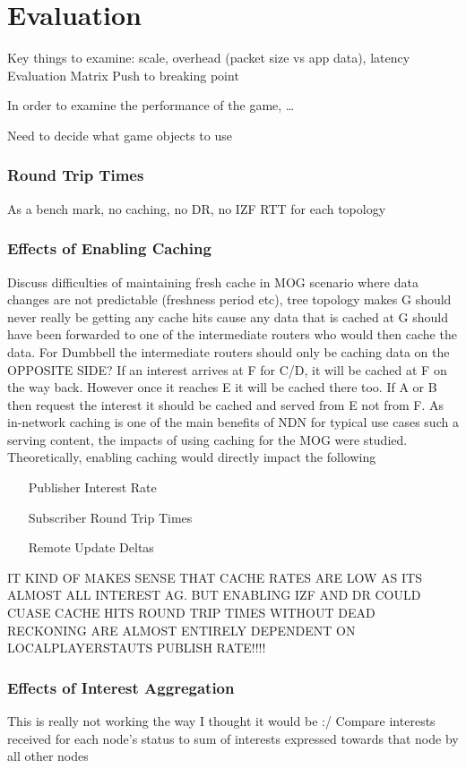 \chapter{Evaluation}
Key things to examine: scale, overhead (packet size vs app data), latency
Evaluation Matrix
Push to breaking point

In order to examine the performance of the game, \dots

Need to decide what game objects to use

\subsection{Round Trip Times}
As a bench mark, no caching, no DR, no IZF RTT for each topology

\subsection{Effects of Enabling Caching}
Discuss difficulties of maintaining fresh cache in MOG scenario where data changes are not predictable (freshness period etc), tree topology makes G should never really be getting any cache hits cause any data that is cached at G should have been forwarded to one of the intermediate routers who would then cache the data. For Dumbbell the intermediate routers should only be caching data on the OPPOSITE SIDE? If an interest arrives at F for C/D, it will be cached at F on the way back. However once it reaches E it will be cached there too. If A or B  then request the interest it should be cached and served from E not from F. 
As in-network caching is one of the main benefits of NDN for typical use cases such a serving content, the impacts of using caching for the MOG were studied. Theoretically, enabling caching would directly impact the following


\begin{itemize}
    \item[Publisher Interest Rate]
    \item[Subscriber Round Trip Times]
    \item[Remote Update Deltas]  
\end{itemize}

IT KIND OF MAKES SENSE THAT CACHE RATES ARE LOW AS ITS ALMOST ALL INTEREST AG. BUT ENABLING IZF AND DR COULD CUASE CACHE HITS 
ROUND TRIP TIMES WITHOUT DEAD RECKONING ARE ALMOST ENTIRELY DEPENDENT ON LOCALPLAYERSTAUTS PUBLISH RATE!!!!
\subsection{Effects of Interest Aggregation}
This is really not working the way I thought it would be :/
Compare interests received for each node's status to sum of interests expressed towards that node by all other nodes


